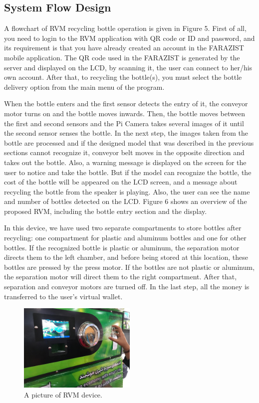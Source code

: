 \documentclass[conference]{IEEEtran}
\begin{document}
\subsection{System Flow Design}
\par 
A flowchart of RVM recycling bottle operation is given in Figure 5. First of all, you need to login to the RVM application with QR code or ID and password, and its requirement is that you have already created an account in the FARAZIST mobile application. The QR code used in the FARAZIST is generated by the server and displayed on the LCD, by scanning it, the user can connect to her/his own account. After that, to recycling the bottle(s), you must select the bottle delivery option from the main menu of the program.
\par 
When the bottle enters and the first sensor detects the entry of it, the conveyor motor turns on and the bottle moves inwards. Then, the bottle moves between the first and second sensors and the Pi Camera takes several images of it until the second sensor senses the bottle. In the next step, the images taken from the bottle are processed and if the designed model that was described in the previous sections cannot recognize it, conveyor belt moves in the opposite direction and takes out the bottle. Also, a warning message is displayed on the screen for the user to notice and take the bottle. But if the model can recognize the bottle, the cost of the bottle will be appeared on the LCD screen, and a message about recycling the bottle from the speaker is playing. Also, the user can see the name and number of bottles detected on the LCD. Figure 6 shows an overview of the proposed RVM, including the bottle entry section and the display.
\par 
In this device, we have used two separate compartments to store bottles after recycling: one compartment for plastic and aluminum bottles and one for other bottles. If the recognized bottle is plastic or aluminum, the separation motor directs them to the left chamber, and before being stored at this location, these bottles are pressed by the press motor. If the bottles are not plastic or aluminum, the separation motor will direct them to the right compartment. After that, separation and conveyor motors are turned off. In the last step, all the money is transferred to the user's virtual wallet.

\begin{figure}
    \centering
    \includegraphics[width=0.5\textwidth]{RVM.jpg}
    \caption{A picture of RVM device.}
\end{figure}
\end{document}
